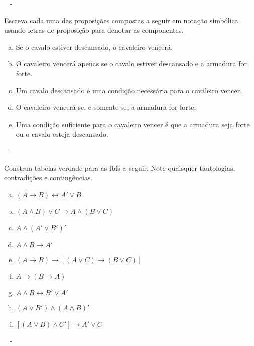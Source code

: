 \documentclass[a4paper, 12pt, addpoints]{exam}
\begin{document}
\begin{questions}
  \begin{resp}~
    -
  \end{resp}

  \question Escreva cada uma das proposições compostas a seguir em notação simbólica usando
  letras de proposição para denotar as componentes.

  \begin{enumerate}[a)]
    \item Se o cavalo estiver descansado, o cavaleiro vencerá.
    \item O cavaleiro vencerá apenas se o cavalo estiver descansado e a armadura for
          forte.
    \item Um cavalo descansado é uma condição necessária para o cavaleiro vencer.
    \item O cavaleiro vencerá se, e somente se, a armadura for forte.
    \item Uma condição suficiente para o cavaleiro vencer é que a armadura seja forte
          ou o cavalo esteja descansado.
  \end{enumerate}

  \begin{resp}~
    -
  \end{resp}

  \question Construa tabelas-verdade para as fbfs a seguir. Note quaisquer tautologias,
  contradições e contingências.
  \begin{multicols}{2}
    \begin{enumerate}[a)]
      \item $(A \rightarrow B) \leftrightarrow A' \vee B$
      \item $(A \wedge B) \vee C \rightarrow A \wedge (B \vee C)$
      \item $A \wedge (A' \vee B')'$
      \item $A \wedge B \rightarrow A'$
      \item $(A \rightarrow B) \rightarrow [(A \vee C) \rightarrow ( B \vee C)]$
      \item $A \rightarrow (B \rightarrow A)$
      \item $A \wedge B \leftrightarrow B' \vee A'$
      \item $(A \vee B') \wedge (A \wedge B)'$
      \item $[(A \vee B) \wedge C'] \rightarrow A' \vee C$
    \end{enumerate}
  \end{multicols}
  \begin{resp}~
    -
  \end{resp}


\end{questions}
\end{document}
